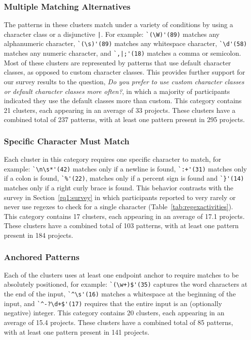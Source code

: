 \subsubsection{Multiple Matching Alternatives}
The patterns in these clusters match under a variety of conditions by using a character class or a disjunctive \verb!|!.
For example:
\verb!`(\W)'(89)! matches any alphanumeric character, \verb!`(\s)'(89)! matches any whitespace character, \verb!`\d'(58)! matches any numeric character, and \verb!`,|;'(18)! matches a comma or semicolon.  Most of these clusters are represented by patterns that use default character classes, as opposed to custom character classes.  This provides further support for our survey results to the question, \emph{Do you prefer to use custom character classes or default character classes more often?}, in which a majority of participants indicated they use the default classes more than custom.
This category contains 21 clusters, each appearing in an average of 33 projects.  These clusters have a combined total of 237 patterns, with at least one pattern present in 295 projects.

\subsubsection{Specific Character Must Match}
\label{cluster:single}
Each cluster in this category requires one specific character to match, for example:
\verb!`\n\s*'(42)! matches only if a newline is found, \verb!`:+'(31)! matches only if a colon is found, \verb!`%'(22)!, matches only if a percent sign is found and \verb!`}'(14)! matches only if a right curly brace is found.
This behavior contrasts with the survey in Section~\ref{rq1:survey} in which participants reported to very rarely or never use regexes to check for a single character (Table~\ref{tab:regexactivities}).
This category contains 17 clusters, each appearing in an average of 17.1 projects.  These clusters have a combined total of 103 patterns, with at least one pattern present in 184 projects.

\subsubsection{Anchored Patterns}
Each of the clusters uses at least one endpoint anchor to require matches to be absolutely positioned, for example:
\verb!`(\w+)$'(35)! captures the word characters at the end of the input, \verb!`^\s'(16)! matches a whitespace at the beginning of the input, and \verb!`^-?\d+$'(17)! requires that the entire input is an (optionally negative) integer.
This category contains 20 clusters, each appearing in an average of 15.4 projects.  These clusters have a combined total of 85 patterns, with at least one pattern present in 141 projects.

